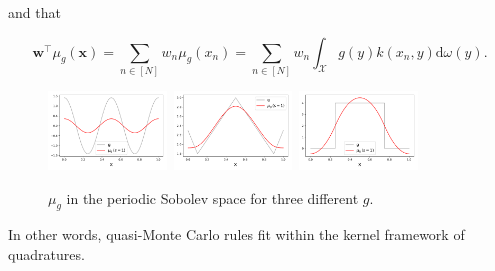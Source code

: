 \documentclass[twoside,11pt]{book}
\numberwithin{theorem}{chapter}
\numberwithin{definition}{chapter}
\numberwithin{proposition}{chapter}
\numberwithin{corollary}{chapter}
\numberwithin{example}{chapter}
\numberwithin{lemma}{chapter}
\numberwithin{assumption}{chapter}
\numberwithin{equation}{chapter}
\numberwithin{figure}{chapter}
\DeclareMathOperator{\Tran}{\intercal}
\begin{document}
and that

\begin{equation}
\bm{w}^{\Tran} \mu_{g}(\bm{x}) = \sum\limits_{n \in [N]} w_{n}\mu_{g}(x_{n}) = \sum\limits_{n \in [N]} w_{n}\int_{\mathcal{X}}g(y)k(x_{n},y) \mathrm{d}\omega(y).
\end{equation}



\begin{figure}[]
    \centering
\includegraphics[width= 0.28\textwidth]{img/mean_element/Sobolev/mean_element_cos_ko_1.pdf}~\includegraphics[width= 0.28\textwidth]{img/mean_element/Sobolev/mean_element_saw_ko_1.pdf}~\includegraphics[width= 0.28\textwidth]{img/mean_element/Sobolev/mean_element_step_ko_1.pdf}\\
\caption{$\mu_{g}$ in the periodic Sobolev space for three different $g$.
\label{fig:mean_element}}
\end{figure}


In other words, quasi-Monte Carlo rules fit within the kernel framework of quadratures. 








\end{document}
